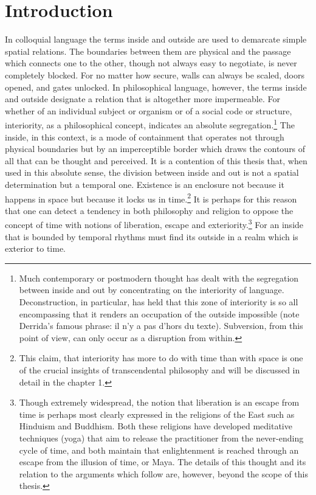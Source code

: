 \chapter{Introduction}

In colloquial language the terms inside and outside are used to demarcate simple spatial relations. The boundaries between them are physical and the passage which connects one to the other, though not always easy to negotiate, is never completely blocked. For no matter how secure, walls can always be scaled, doors opened, and gates unlocked. In philosophical language, however, the terms inside and outside designate a relation that is altogether more impermeable. For whether of an individual subject or organism or of a social code or structure, interiority, as a philosophical concept, indicates an absolute segregation.\footnote{Much contemporary or postmodern thought has dealt with the segregation between inside and out by concentrating on the interiority of language. Deconstruction, in particular, has held that this zone of interiority is so all encompassing that it renders an occupation of the outside impossible (note Derrida's famous phrase: il n'y a pas d'hors du texte). Subversion, from this point of view, can only occur as a disruption from within.} The inside, in this context, is a mode of containment that operates not through physical boundaries but by an imperceptible border which draws the contours of all that can be thought and perceived. It is a contention of this thesis that, when used in this absolute sense, the division between inside and out is not a spatial determination but a temporal one. Existence is an enclosure not because it happens in space but because it locks us in time.\footnote{This claim, that interiority has more to do with time than with space is one of the crucial insights of transcendental philosophy and will be discussed in detail in the chapter 1.} It is perhaps for this reason that one can detect a tendency in both philosophy and religion to oppose the concept of time with notions of liberation, escape and exteriority.\footnote{Though extremely widespread, the notion that liberation is an escape from time is perhaps most clearly expressed in the religions of the East such as Hinduism and Buddhism. Both these religions have developed meditative techniques (yoga) that aim to release the practitioner from the never-ending cycle of time, and both maintain that enlightenment is reached through an escape from the illusion of time, or Maya. The details of this thought and its relation to the arguments which follow are, however, beyond the scope of this thesis.} For an inside that is bounded by temporal rhythms must find its outside in a realm which is exterior to time. 

